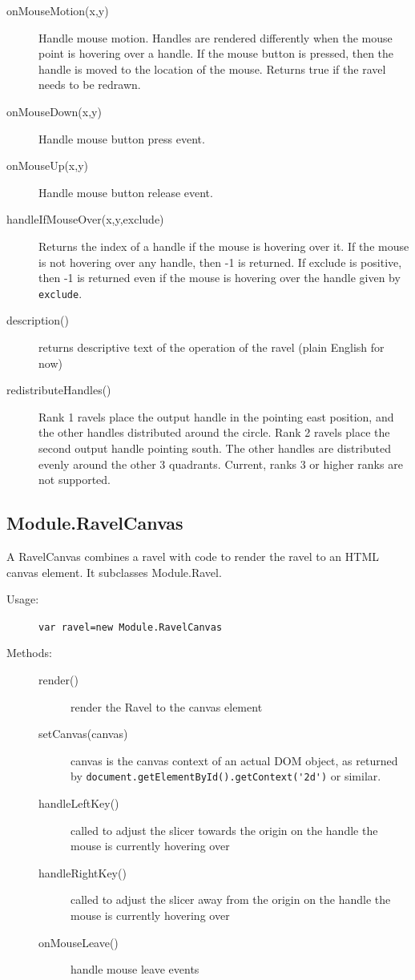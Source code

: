 \documentclass{article}
\begin{document}
\begin{description}
\begin{description}
  \item[onMouseMotion(x,y)] Handle mouse motion. Handles are rendered
    differently when the mouse point is hovering over a
    handle. If the mouse button is pressed, then the handle is moved
    to the location of the mouse. Returns true if the ravel needs to be redrawn.
  \item[onMouseDown(x,y)] Handle mouse button press event.
  \item[onMouseUp(x,y)] Handle mouse button release event.
    
  \item[handleIfMouseOver(x,y,exclude)] Returns the index of a handle if
    the mouse is hovering over it. If the mouse is not hovering over any
    handle, then -1 is returned. If exclude is positive, then -1 is
    returned even if the mouse is hovering over the handle given by {\tt
      exclude}.

  \item[description()] returns descriptive text of the operation of the
    ravel (plain English for now)
    
  \item[redistributeHandles()] Rank 1 ravels place the output handle in
    the pointing east position, and the other handles distributed around
    the circle. Rank 2 ravels place the second output handle pointing
    south. The other handles are distributed evenly around the other 3
    quadrants. Current, ranks 3 or higher ranks are not supported.
    
  \end{description} 
\end{description} 

\subsection{Module.RavelCanvas}

A RavelCanvas combines a ravel with code to render the ravel to an
HTML canvas element. It subclasses Module.Ravel.

\begin{description}
\item[Usage:] \verb+var ravel=new Module.RavelCanvas+

\item[Methods:]\mbox{}
\begin{description}
\item[render()] render the Ravel to the canvas element
\item[setCanvas(canvas)] canvas is the canvas context of an actual DOM object, as returned
  by \verb+document.getElementById().getContext('2d')+ or similar.
\item[handleLeftKey()] called to adjust the slicer towards the origin
  on the handle the mouse is currently hovering over
\item[handleRightKey()] called to adjust the slicer away from the origin
  on the handle the mouse is currently hovering over
\item[onMouseLeave()] handle mouse leave events
\end{description}
\end{description}
\end{document}
